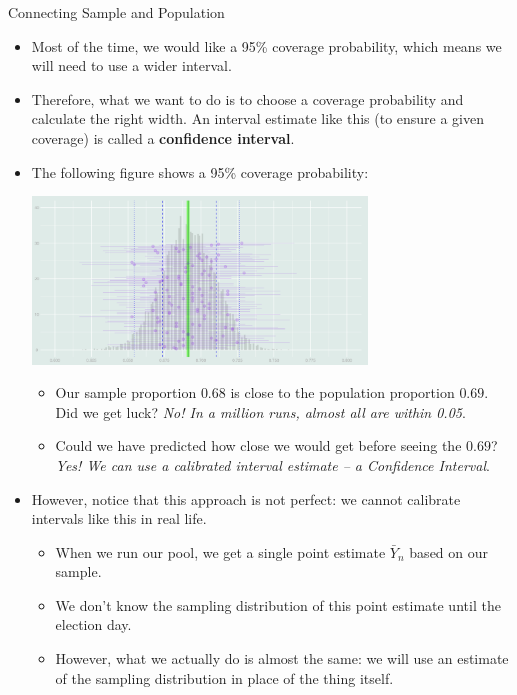 \begin{eg}{Connecting Sample and Population}
\begin{itemize}
\begin{itemize}
\begin{itemize}
				\item Repeat the sampling process multiple times, say $M$ times, and we notice that out of $t$ times our interval ``touches'' the population proportion. 
				\item Then, we can define the coverage probability as follows: \[\text{coverage probability}=\dfrac{t}{M}=\P\qty(\bar{Y}_n\in\bar{y}_N\pm \dfrac{x}{2}),\] where $\bar{Y}_n$ is our point estimate, $\bar{y}_N$ is the population proportion, and $x$ is the width of the interval. 
			\end{itemize} 
		\end{itemize}
		\item Most of the time, we would like a 95\% coverage probability, which means we will need to use a wider interval. 
		\item Therefore, what we want to do is to choose a coverage probability and calculate the right width. An interval estimate like this (to ensure a given coverage) is called a \textbf{confidence interval}.
		\item The following figure shows a 95\% coverage probability: \begin{center}\includegraphics[width=0.7\textwidth]{figs/95ConfidenceInterval.png}\end{center}
		\begin{itemize}
			\item Our sample proportion $0.68$ is close to the population proportion $0.69$. Did we get luck? \textit{No! In a million runs, almost all are within 0.05}.
			\item Could we have predicted how close we would get before seeing the $0.69$? \textit{Yes! We can use a calibrated interval estimate -- a Confidence Interval}.
		\end{itemize}
		\item However, notice that this approach is not perfect: we cannot calibrate intervals like this in real life. 
		\begin{itemize}
			\item When we run our pool, we get a single point estimate $\bar{Y}_n$ based on our sample. 
			\item We don't know the sampling distribution of this point estimate until the election day.
			\item However, what we actually do is almost the same: we will use an estimate of the sampling distribution in place of the thing itself. 
		\end{itemize} 
	\end{itemize}
\end{eg}


